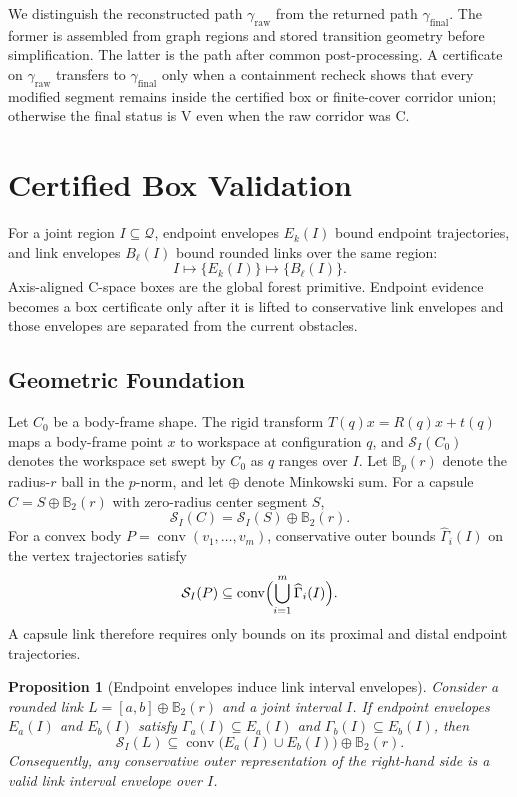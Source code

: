 \documentclass[journal]{IEEEtran}
\newtheorem{proposition}{Proposition}
\newcommand{\Ball}{\ensuremath{\mathbb{B}}}
\newcommand{\Q}{\ensuremath{\mathcal{Q}}}
\newcommand{\cspace}{\mbox{C-space}}
\newcommand{\StatusC}{\ensuremath{\mathrm{C}}}
\newcommand{\StatusV}{\ensuremath{\mathrm{V}}}
\newcommand{\gammaraw}{\ensuremath{\gamma_{\mathrm{raw}}}}
\newcommand{\gammafinal}{\ensuremath{\gamma_{\mathrm{final}}}}
\begin{document}
We distinguish the reconstructed path \gammaraw{} from the returned path
\gammafinal{}. The former is assembled from graph regions and stored transition
geometry before simplification. The latter is the path after common
post-processing. A certificate on \gammaraw{} transfers to \gammafinal{} only
when a containment recheck shows that every modified segment remains inside the
certified box or finite-cover corridor union; otherwise the final status is
\StatusV{} even when the raw corridor was \StatusC{}.

\section{Certified Box Validation}\label{sec:link_envelopes}

For a joint region $I\subseteq\Q$, endpoint envelopes $E_k(I)$ bound endpoint
trajectories, and link envelopes $B_\ell(I)$ bound rounded links over the same
region:
\[
I \mapsto \{E_k(I)\} \mapsto \{B_\ell(I)\}.
\]
Axis-aligned \cspace{} boxes are the global forest primitive. Endpoint evidence
becomes a box certificate only after it is lifted to conservative link envelopes
and those envelopes are separated from the current obstacles.

\subsection{Geometric Foundation}\label{sec:rewrite_geom}

Let $C_0$ be a body-frame shape. The rigid transform
$T(q)x=R(q)x+t(q)$ maps a body-frame point $x$ to workspace at configuration
$q$, and $\mathcal{S}_I(C_0)$ denotes the workspace set swept by $C_0$ as $q$
ranges over $I$. Let $\Ball_p(r)$ denote the radius-$r$ ball in the $p$-norm,
and let $\oplus$ denote Minkowski sum. For a capsule
$C=S\oplus\Ball_2(r)$ with zero-radius center segment $S$,
\[
\mathcal{S}_I(C)=\mathcal{S}_I(S)\oplus\Ball_2(r).
\]
For a convex body $P=\operatorname{conv}(v_1,\ldots,v_m)$, conservative outer
bounds $\widehat{\Gamma}_i(I)$ on the vertex trajectories satisfy
\[
\mathcal{S}_I(P)\subseteq
\operatorname{conv}\Bigl(\bigcup_{i=1}^{m}\widehat{\Gamma}_i(I)\Bigr).
\]
A capsule link therefore requires only bounds on its proximal and distal
endpoint trajectories.

\begin{proposition}[Endpoint envelopes induce link interval envelopes]
\label{prop:endpoint_to_link_envelope}
Consider a rounded link $L=[a,b]\oplus\Ball_2(r)$ and a joint interval $I$. If
endpoint envelopes $E_a(I)$ and $E_b(I)$ satisfy
$\Gamma_a(I)\subseteq E_a(I)$ and $\Gamma_b(I)\subseteq E_b(I)$, then
\[
\mathcal{S}_I(L)
\subseteq
\operatorname{conv}\bigl(E_a(I)\cup E_b(I)\bigr)\oplus\Ball_2(r).
\]
Consequently, any conservative outer representation of the right-hand side is a
valid link interval envelope over $I$.
\end{proposition}
\end{document}
